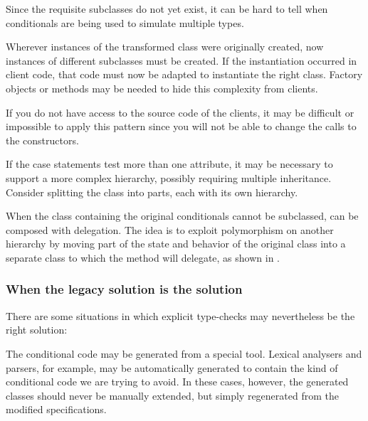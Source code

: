 \documentclass[a4paper,10pt,twoside]{book}
\begin{document}
\begin{bulletlist}
\item Since the requisite subclasses do not yet exist, it can be hard to tell when conditionals are being used to simulate multiple types.

\item Wherever instances of the transformed class were originally created, now instances of different subclasses must be created. If the instantiation occurred in client code, that code must now be adapted to instantiate the right class. Factory objects or methods may be needed to hide this complexity from clients.

\item If you do not have access to the source code of the clients, it may be difficult or impossible to apply this pattern since you will not be able to change the calls to the constructors. 

\item If the case statements test more than one attribute, it may be necessary to support a more complex hierarchy, possibly requiring multiple inheritance. Consider splitting the class into parts, each with its own hierarchy.

\item When the class containing the original conditionals cannot be subclassed,  can be composed with delegation. The idea is to exploit polymorphism on another hierarchy by moving part of the state and behavior of the original class into a separate class to which the method will delegate, as shown in .
\end{bulletlist}

\subsubsection*{When the legacy solution is the solution}

There are some situations in which explicit type-checks may nevertheless be the right solution:

\begin{bulletlist}
\item The conditional code may be generated from a special tool. Lexical analysers and parsers, for example, may be automatically generated to contain the kind of conditional code we are trying to avoid. In these cases, however, the generated classes should never be manually extended, but simply regenerated from the modified specifications.
\end{bulletlist}
\end{document}
